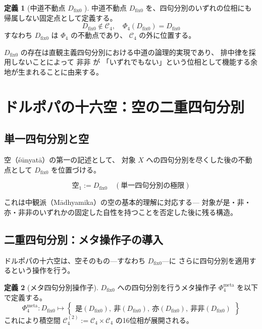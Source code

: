 \documentclass[11pt,a4paper]{article}
\theoremstyle{definition}
\newtheorem{definition}{定義}[section]
\newcommand{\dfix}{D_{\mathrm{fix}0}}
\newcommand{\phiS}{\text{是}}
\newcommand{\phiN}{\text{非}}
\newcommand{\phiSN}{\text{亦}}
\newcommand{\phiNS}{\text{非非}}
\newcommand{\Phifour}{\Phi_{4}}
\newcommand{\Phimeta}{\Phi_{4}^{\mathrm{meta}}}
\begin{document}
\begin{definition}[中道不動点 $\dfix$ \cite{Chiba2026_dfix}]
中道不動点 $\dfix$ を、四句分別のいずれの位相にも帰属しない固定点として定義する。
\begin{equation}
\dfix \notin \mathcal{C}_4, \quad \Phifour(\dfix) = \dfix
\end{equation}
すなわち $\dfix$ は $\Phifour$ の不動点であり、
$\mathcal{C}_4$ の外に位置する。
\end{definition}

$\dfix$ の存在は直観主義四句分別における中道の論理的実現であり、
排中律を採用しないことによって $\phiNS$ が
「いずれでもない」という位相として機能する余地が生まれることに由来する。

\section{ドルポパの十六空：空の二重四句分別}

\subsection{単一四句分別と空}

空（śūnyatā）の第一の記述として、
対象 $X$ への四句分別を尽くした後の不動点として $\dfix$ を位置づける。

\begin{equation}
\text{空}_1 := \dfix \quad (\text{単一四句分別の極限})
\end{equation}

これは中観派（Mādhyamika）の空の基本的理解に対応する---
対象が是・非・亦・非非のいずれかの固定した自性を持つことを否定した後に残る構造。

\subsection{二重四句分別：メタ操作子の導入}

ドルポパの十六空は、空そのもの---すなわち $\dfix$---に
さらに四句分別を適用するという操作を行う。

\begin{definition}[メタ四句分別操作子]
$\dfix$ への四句分別を行うメタ操作子 $\Phimeta$ を以下で定義する。
\begin{equation}
\Phimeta : \dfix \mapsto 
\left\{
\begin{array}{l}
\phiS(\dfix),\ \phiN(\dfix),\ \phiSN(\dfix),\ \phiNS(\dfix)
\end{array}
\right\}
\end{equation}
これにより積空間 $\mathcal{C}_4^{(2)} := \mathcal{C}_4 \times \mathcal{C}_4$
の16位相が展開される。
\end{definition}
\end{document}
